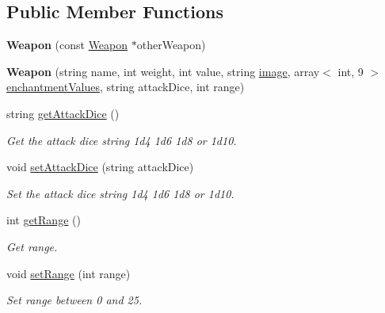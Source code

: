 \subsection*{Public Member Functions}
\begin{DoxyCompactItemize}
\item 
\hypertarget{class_weapon_ad948f8cbd8110949240e46c7c72c9556}{}\label{class_weapon_ad948f8cbd8110949240e46c7c72c9556} 
{\bfseries Weapon} (const \hyperlink{class_weapon}{Weapon} $\ast$other\+Weapon)
\item 
\hypertarget{class_weapon_a0fc6a57eb8c887a7e4a9d72dea29755c}{}\label{class_weapon_a0fc6a57eb8c887a7e4a9d72dea29755c} 
{\bfseries Weapon} (string name, int weight, int value, string \hyperlink{class_item_add84a42b692ee5d580a92ae4a922f784}{image}, array$<$ int, 9 $>$ \hyperlink{class_item_a8532d8729f9433f41b7fc18b20d83236}{enchantment\+Values}, string attack\+Dice, int range)
\item 
\hypertarget{class_weapon_ab3452fb4487ff88c46a4586cde0260cb}{}\label{class_weapon_ab3452fb4487ff88c46a4586cde0260cb} 
string \hyperlink{class_weapon_ab3452fb4487ff88c46a4586cde0260cb}{get\+Attack\+Dice} ()
\begin{DoxyCompactList}\small\item\em Get the attack dice string 1d4 1d6 1d8 or 1d10. \end{DoxyCompactList}\item 
\hypertarget{class_weapon_a17ae76ac029507219ba18f6940b08258}{}\label{class_weapon_a17ae76ac029507219ba18f6940b08258} 
void \hyperlink{class_weapon_a17ae76ac029507219ba18f6940b08258}{set\+Attack\+Dice} (string attack\+Dice)
\begin{DoxyCompactList}\small\item\em Set the attack dice string 1d4 1d6 1d8 or 1d10. \end{DoxyCompactList}\item 
\hypertarget{class_weapon_af0d86939f16add54fc7ae87fea85ac21}{}\label{class_weapon_af0d86939f16add54fc7ae87fea85ac21} 
int \hyperlink{class_weapon_af0d86939f16add54fc7ae87fea85ac21}{get\+Range} ()
\begin{DoxyCompactList}\small\item\em Get range. \end{DoxyCompactList}\item 
\hypertarget{class_weapon_a9227da33ba03135c9df353a91a7b0013}{}\label{class_weapon_a9227da33ba03135c9df353a91a7b0013} 
void \hyperlink{class_weapon_a9227da33ba03135c9df353a91a7b0013}{set\+Range} (int range)
\begin{DoxyCompactList}\small\item\em Set range between 0 and 25. \end{DoxyCompactList}\item 

\end{DoxyCompactItemize}
